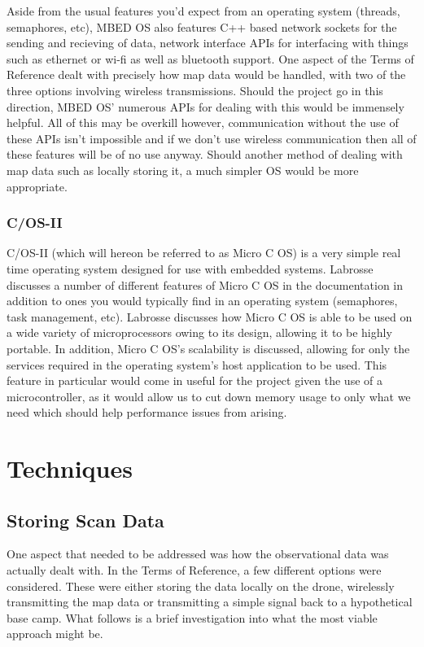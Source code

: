 					Aside from the usual features you'd expect from an operating system (threads, semaphores, etc), MBED OS also features C++ based network sockets for the sending and recieving of data, network interface APIs for interfacing with things such as ethernet or wi-fi as well as bluetooth support. One aspect of the Terms of Reference dealt with precisely how map data would be handled, with two of the three options involving wireless transmissions. Should the project go in this direction, MBED OS' numerous APIs for dealing with this would be immensely helpful. All of this may be overkill however, communication without the use of these APIs isn't impossible and if we don't use wireless communication then all of these features will be of no use anyway. Should another method of dealing with map data such as locally storing it, a much simpler OS would be more appropriate.
					
					\subsubsection{\textmu C/OS-II}
					\textmu C/OS-II (which will hereon be referred to as Micro C OS) is a very simple real time operating system designed for use with embedded systems. Labrosse\citep{labrosse2002microc} discusses a number of different features of Micro C OS in the documentation in addition to ones you would typically find in an operating system (semaphores, task management, etc). Labrosse discusses how Micro C OS is able to be used on a wide variety of microprocessors owing to its design, allowing it to be highly portable. In addition, Micro C OS's scalability is discussed, allowing for only the services required in the operating system's host application to be used. This feature in particular would come in useful for the project given the use of a microcontroller, as it would allow us to cut down memory usage to only what we need which should help performance issues from arising.
			
			
			\section{Techniques}
				\subsection{Storing Scan Data}
				One aspect that needed to be addressed was how the observational data was actually dealt with. In the Terms of Reference, a few different options were considered. These were either storing the data locally on the drone, wirelessly transmitting the map data or transmitting a simple signal back to a hypothetical base camp. What follows is a brief investigation into what the most viable approach might be.
				
